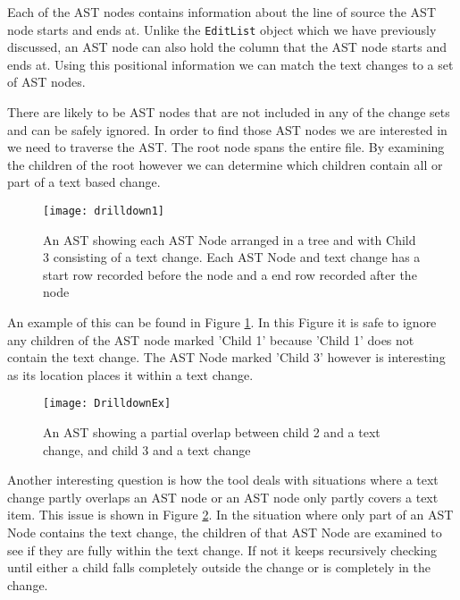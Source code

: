 Each of the AST nodes contains information about the line of source the AST node starts and ends at.  Unlike the \lstinline{EditList} object which we have previously discussed, an AST node can also hold the column that the AST node starts and ends at.  Using this positional information we can match the text changes to a set of AST nodes.

There are likely to be AST nodes that are not included in any of the change sets and can be safely ignored. In order to find those AST nodes we are interested in we need to traverse the AST.  The root node spans the entire file.  By examining the children of the root however we can determine which children contain all or part of a text based change.

\begin{figure}[!t]
 \begin{center}
  \texttt{[image: drilldown1]}
 \end{center}
 \caption{An AST showing each AST Node arranged in a tree and with Child 3 consisting of a text change.  Each AST Node and text change has a start row recorded before the node and a end row recorded after the node}
 \label{fig:findingASTNode}
\end{figure}

An example of this can be found in Figure \ref{fig:findingASTNode}.  In this Figure it is safe to ignore any children of the AST node marked 'Child 1' because 'Child 1' does not contain the text change.  The AST Node marked 'Child 3' however is interesting as its location places it within a text change. 


\begin{figure}[!t]
 \begin{center}
  \texttt{[image: DrilldownEx]}
 \end{center}
 \caption{An AST showing a partial overlap between child 2 and a text change, and child 3 and a text change}
 \label{fig:troubleASTNode}
\end{figure}

Another interesting question is how the tool deals with situations where a text change partly overlaps an AST node or an AST node only partly covers a text item.  This issue is shown in Figure \ref{fig:troubleASTNode}. In the situation where only part of an AST Node contains the text change, the children of that AST Node are examined to see if they are fully within the text change.  If not it keeps recursively checking until either a child falls completely outside the change or is completely in the change.  

